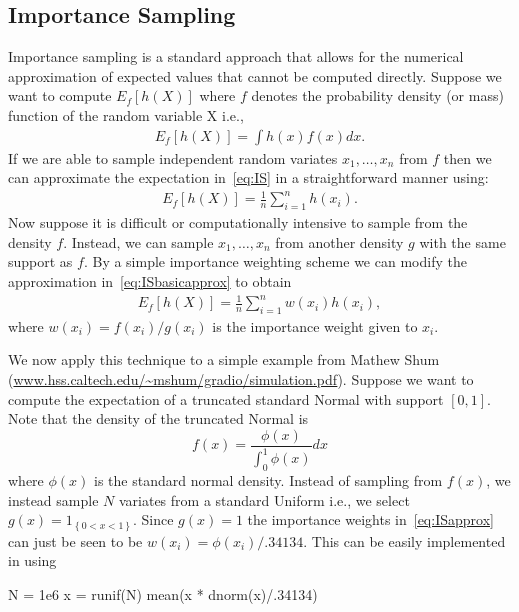 \subsection{Importance Sampling}\label{subsec:IS}

Importance sampling is a standard approach that allows for the numerical
approximation of expected values that cannot be computed directly. 
Suppose we want to compute $E_{f}[h(X)]$ where $f$ denotes the 
probability density (or mass) function of the random variable X i.e., 
\begin{align}\label{eq:IS}
 E_{f}[h(X)] = \int h(x) f(x) dx .
\end{align}
If we are able to sample independent random variates $x_{1},\ldots,x_{n}$
from $f$ then we can approximate the expectation in~\eqref{eq:IS} in a
straightforward manner using:
\begin{align}\label{eq:ISbasicapprox}
  E_{f}[h(X)] = \frac{1}{n} \sum_{i=1}^{n} h(x_i) .
\end{align}
Now suppose it is difficult or computationally intensive to sample from
the density $f$. Instead, we can sample $x_{1},\ldots,x_{n}$ from another
density $g$ with the same support as $f$. By a simple importance weighting
scheme we can modify the approximation in~\eqref{eq:ISbasicapprox} to obtain
\begin{align}\label{eq:ISapprox}
  E_{f}[h(X)] = \frac{1}{n} \sum_{i=1}^{n} w(x_{i})h(x_{i}) ,
\end{align}
where $w(x_i) = f(x_i)/g(x_i)$ is the importance weight given to $x_{i}$.

We now apply this technique to a simple example from Mathew Shum
(\url{www.hss.caltech.edu/~mshum/gradio/simulation.pdf}).
Suppose we want to compute the expectation of a truncated standard 
Normal with support $[0,1]$. Note that the density of the truncated Normal is
$$f(x) = \frac{\phi(x)}{\int_{0}^{1} \phi(x)} dx$$ 
where $\phi(x)$ is the standard normal density. Instead of sampling
from $f(x)$, we instead sample $N$ variates from a standard Uniform
i.e., we select $g(x) = 1_{\left\{0<x<1\right\}}$. Since $g(x)=1$ the
importance weights in~\eqref{eq:ISapprox} can just be seen to 
be $w(x_{i})=\phi(x_i)/.34134$. This can be easily implemented in \R{} using
\begin{RCode}
N = 1e6
x = runif(N)
mean(x * dnorm(x)/.34134)
\end{RCode}

